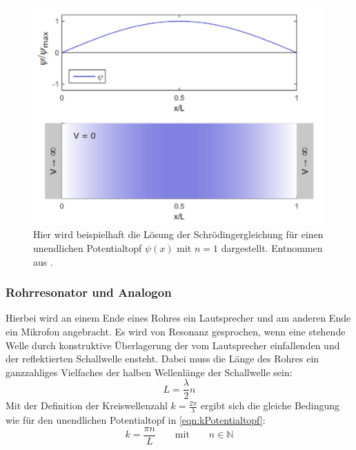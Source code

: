            \begin{figure}[h]
                \centering
                \includegraphics[scale=0.6]{pictures/Potentialtopf.png}
                \caption{Hier wird beispielhaft die Lösung der Schrödingergleichung für einen unendlichen Potentialtopf $\psi(x)$ mit $n=1$ dargestellt. Entnommen aus \cite{httpsapphysikuni-konstanzdeap-publicanleitungenquantenmodelle-teil1pdf_quantenmodelle-teil1pdf_nodate}.}
                \label{fig:Potentialtopf}
            \end{figure}

            \FloatBarrier

        \subsubsection*{Rohrresonator und Analogon}
            Hierbei wird an einem Ende eines Rohres ein Lautsprecher und am anderen Ende ein Mikrofon angebracht. Es wird von Resonanz gesprochen, wenn eine stehende Welle durch konstruktive Überlagerung der vom Lautsprecher einfallenden und der reflektierten Schallwelle ensteht. Dabei muss die Länge des Rohres ein ganzzahliges Vielfaches der halben Wellenlänge der Schallwelle sein:
            \begin{equation*}
                L = \frac{\lambda}{2} n
            \end{equation*}
            Mit der Definition der Kreiswellenzahl $k = \frac{2\pi}{\lambda}$ ergibt sich die gleiche Bedingung wie für den unendlichen Potentialtopf in \eqref{eqn:kPotentialtopf}:
            \begin{equation*}
                k = \frac{\pi n}{L} \qquad \text{mit} \qquad n \in \mathbb{N}
            \end{equation*}

